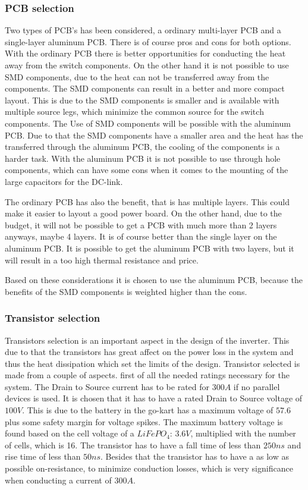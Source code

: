 \subsubsection{PCB selection}   \label{PCB_selection}
Two types of PCB's has been considered, a ordinary multi-layer PCB and a single-layer aluminum PCB. There is of course pros and cons for both options. With the ordinary PCB there is better opportunities for conducting the heat away from the switch components. On the other hand it is not possible to use SMD components, due to the heat can not be transferred away from the components. The SMD components can result in a better and more compact layout. This is due to the SMD components is smaller and is available with multiple source legs, which minimize the common source for the switch components. The Use of SMD components will be possible with the aluminum PCB. Due to that the SMD components have a smaller area and the heat has the transferred through the aluminum PCB, the cooling of the components is a harder task. With the aluminum PCB it is not possible to use through hole components, which can have some cons when it comes to the mounting of the large capacitors for the DC-link. 

 The ordinary PCB has also the benefit, that is has multiple layers. This could make it easier to layout a good power board. On the other hand, due to the budget, it will not be possible to get a PCB with much more than 2 layers anyways, maybe 4 layers. It is of course better than the single layer on the aluminum PCB. It is possible to get the aluminum PCB with two layers, but it will result in a  too high thermal resistance and price.

Based on these considerations it is chosen to use the aluminum PCB, because the benefits of the SMD components is weighted higher than the cons.


\subsubsection{Transistor selection}
Transistors selection is an important aspect in the design of the inverter. This due to that the transistors has great affect on the power loss in the system and thus the heat dissipation which set the limits of the design. Transistor selected is made from a couple of aspects. first of all the needed ratings necessary for the system. The Drain to Source current has to be rated for $300 A$ if no parallel devices is used. It is chosen that it has to have a rated Drain to Source voltage of $100 V$. This is due to the battery in the go-kart has a maximum voltage of $57.6$ plus some safety margin for voltage spikes. The maximum battery voltage is found based on the cell voltage of a $LiFePO_4$: $3.6 V$, multiplied with the number of cells, which is 16. The transistor has to have a fall time of less than $250ns$ and rise time of less than $50ns$. Besides that the transistor has to have a as low as possible on-resistance, to minimize conduction losses, which is very significance when conducting a current of $300A$.

